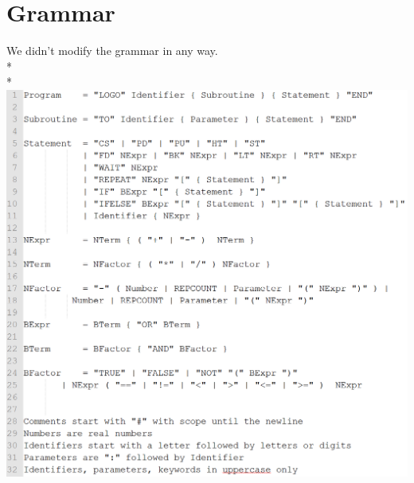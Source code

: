 \section{Grammar}
\label{sec:grammar}
We didn't modify the grammar in any way.\\*\\*
\includegraphics[scale=1.0]{bilder/grammar.png}


